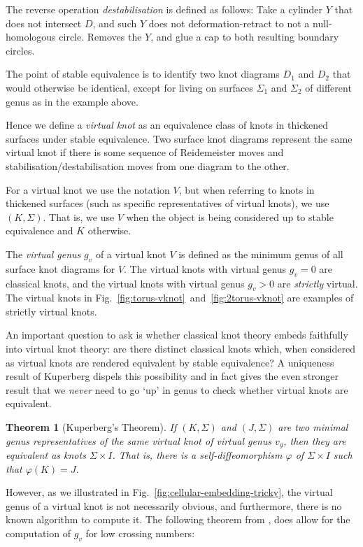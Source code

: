 \documentclass[12pt]{report}
\newtheorem*{theorem}{Theorem}
\theoremstyle{upright}
\begin{document}
The reverse operation \textit{destabilisation} is defined as follows: Take a cylinder $Y$ that does not intersect $D$, and such $Y$ does not deformation-retract to not a null-homologous circle. Removes the $Y$, and glue a cap to both resulting boundary circles.

The point of stable equivalence is to identify two knot diagrams $D_{1}$ and $D_{2}$ that would otherwise be identical, except for living on surfaces $\Sigma_{1}$ and $\Sigma_{2}$ of different genus as in the example above.

Hence we define a \textit{virtual knot} as an equivalence class of knots in thickened surfaces under stable equivalence. Two surface knot diagrams represent the same virtual knot if there is some sequence of Reidemeister moves and stabilisation/destabilisation moves from one diagram to the other.

For a virtual knot we use the notation $V$, but when referring to knots in thickened surfaces (such as specific representatives of virtual knots), we use $(K, \Sigma)$. That is, we use $V$ when the object is being considered up to stable equivalence and $K$ otherwise.

The \textit{virtual genus} $g_{v}$ of a virtual knot $V$ is defined as the minimum genus of all surface knot diagrams for $V$. The virtual knots with virtual genus $g_{v} = 0$ are classical knots, and the virtual knots with virtual genus $g_{v} > 0$ are \textit{strictly} virtual. The virtual knots in Fig.~\ref{fig:torus-vknot}~and~\ref{fig:2torus-vknot} are examples of strictly virtual knots.

An important question to ask is whether classical knot theory embeds faithfully into virtual knot theory: are there distinct classical knots which, when considered as virtual knots are rendered equivalent by stable equivalence? A uniqueness result of Kuperberg dispels this possibility and in fact gives the even stronger result that we \textit{never} need to go `up' in genus to check whether virtual knots are equivalent.

\begin{theorem}[Kuperberg's Theorem]
If $(K, \Sigma)$ and $(J, \Sigma)$ are two minimal genus representatives of the same virtual knot of virtual genus $v_{g}$, then they are equivalent as knots $\Sigma \times I$. That is, there is a self-diffeomorphism $\varphi$ of $\Sigma \times I$ such that $\varphi(K) = J$.
\end{theorem}

However, as we illustrated in Fig.~\ref{fig:cellular-embedding-tricky}, the virtual genus of a virtual knot is not necessarily obvious, and furthermore, there is no known algorithm to compute it. The following theorem from \cite{parity-and-projection}, does allow for the computation of $g_{v}$ for low crossing numbers:
\end{document}
